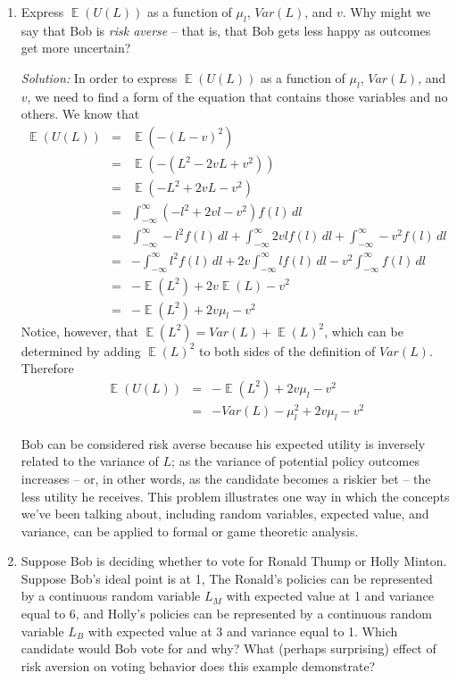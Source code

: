 \documentclass[11pt]{article}
\DeclareMathOperator*{\E}{\mathbb{E}}
\begin{document}
\begin{enumerate}
\item Express $\E(U(L))$ as a function of $\mu_l$, $Var(L)$, and $v$. Why might we say that Bob is \textit{risk averse} -- that is, that Bob gets less happy as outcomes get more uncertain?

{\it Solution:} In order to express $\E(U(L))$ as a function of $\mu_l$, $Var(L)$, and $v$, we need to find a form of the equation that contains those variables and no others. We know that
\begin{eqnarray*}
\E(U(L)) &=& \E(-(L-v)^2) \\
&=& \E(-(L^2 - 2vL + v^2)) \\
&=& \E(-L^2 +2vL - v^2) \\
&=& \int_{-\infty}^{\infty}  \! (-l^2 + 2vl - v^2)f(l) \, dl \\
&=&  \int_{-\infty}^{\infty}  \! -l^2f(l) \, dl +  \int_{-\infty}^{\infty}  \! 2vlf(l) \, dl +  \int_{-\infty}^{\infty}  \! -v^2f(l) \, dl \\
&=&  -\int_{-\infty}^{\infty}  \! l^2f(l) \, dl +  2v\int_{-\infty}^{\infty}  \! lf(l) \, dl - v^2\int_{-\infty}^{\infty}  \! f(l) \, dl \\
&=& -\E(L^2) + 2v\E(L) - v^2 \\
&=& -\E(L^2) + 2v\mu_l - v^2
\end{eqnarray*}
Notice, however, that $\E(L^2) = Var(L) + \E(L)^2$, which can be determined by adding $\E(L)^2$ to both sides of the definition of $Var(L)$. Therefore
\medskip
\begin{eqnarray*}
\E(U(L)) &=& -\E(L^2) + 2v\mu_l - v^2 \\
&=& -Var(L) - \mu_l^2 + 2v\mu_l-v^2
\end{eqnarray*}

Bob can be considered risk averse because his expected utility is inversely related to the variance of $L$; as the variance of potential policy outcomes increases -- or, in other words, as the candidate becomes a riskier bet -- the less utility he receives. This problem illustrates one way in which the concepts we've been talking about, including random variables, expected value, and variance, can be applied to formal or game theoretic analysis.

\pagebreak

\item Suppose Bob is deciding whether to vote for Ronald Thump or Holly Minton. Suppose Bob's ideal point is at 1, The Ronald's policies can be represented by a continuous random variable $L_M$ with expected value at 1 and variance equal to 6, and Holly's policies can be represented by a continuous random variable $L_B$ with expected value at 3 and variance equal to 1. Which candidate would Bob vote for and why? What (perhaps surprising) effect of risk aversion on voting behavior does this example demonstrate?


\end{enumerate}
\end{document}
